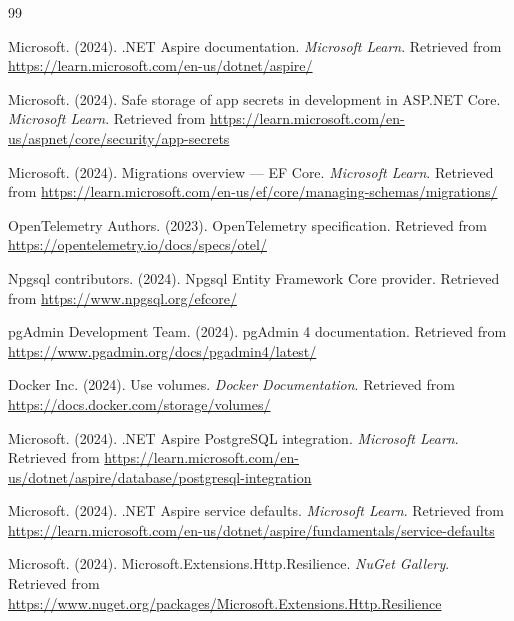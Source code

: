 \begin{thebibliography}{99}

Microsoft. (2024).
.NET Aspire documentation.
\textit{Microsoft Learn}.
Retrieved from \url{https://learn.microsoft.com/en-us/dotnet/aspire/}

Microsoft. (2024).
Safe storage of app secrets in development in ASP.NET Core.
\textit{Microsoft Learn}.
Retrieved from \url{https://learn.microsoft.com/en-us/aspnet/core/security/app-secrets}

Microsoft. (2024).
Migrations overview --- EF Core.
\textit{Microsoft Learn}.
Retrieved from \url{https://learn.microsoft.com/en-us/ef/core/managing-schemas/migrations/}

OpenTelemetry Authors. (2023).
OpenTelemetry specification.
Retrieved from \url{https://opentelemetry.io/docs/specs/otel/}

Npgsql contributors. (2024).
Npgsql Entity Framework Core provider.
Retrieved from \url{https://www.npgsql.org/efcore/}

pgAdmin Development Team. (2024).
pgAdmin 4 documentation.
Retrieved from \url{https://www.pgadmin.org/docs/pgadmin4/latest/}

Docker Inc. (2024).
Use volumes.
\textit{Docker Documentation}.
Retrieved from \url{https://docs.docker.com/storage/volumes/}

Microsoft. (2024).
.NET Aspire PostgreSQL integration.
\textit{Microsoft Learn}.
Retrieved from \url{https://learn.microsoft.com/en-us/dotnet/aspire/database/postgresql-integration}

Microsoft. (2024).
.NET Aspire service defaults.
\textit{Microsoft Learn}.
Retrieved from \url{https://learn.microsoft.com/en-us/dotnet/aspire/fundamentals/service-defaults}

Microsoft. (2024).
Microsoft.Extensions.Http.Resilience.
\textit{NuGet Gallery}.
Retrieved from \url{https://www.nuget.org/packages/Microsoft.Extensions.Http.Resilience}

\end{thebibliography}
